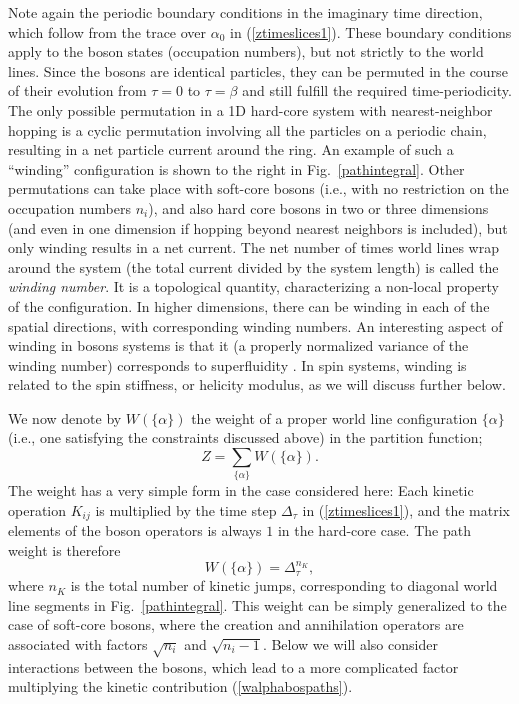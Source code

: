 \documentclass[draft,numberedheadings]{aipproc}
\begin{document}
Note again the periodic boundary conditions in the imaginary time direction, which follow from the trace over $\alpha_0$ in (\ref{ztimeslices1}). These boundary 
conditions apply to the boson states (occupation numbers), but not strictly to the world lines. Since the bosons are identical particles, they can be permuted in 
the course of their evolution from $\tau=0$ to $\tau=\beta$ and still fulfill the required time-periodicity. The only possible permutation in a 1D hard-core 
system with nearest-neighbor hopping is a cyclic permutation involving all the particles on a periodic chain, resulting in a net particle current around the 
ring. An example of such a ``winding'' configuration is shown to the right in Fig.~\ref{pathintegral}. Other permutations can take place with soft-core bosons
(i.e., with no restriction on the occupation numbers $n_i$), and also hard core bosons in two or three dimensions (and even in one dimension if hopping beyond 
nearest neighbors is included), but only winding results in a net current. The net number of times world lines wrap around the system (the total current divided 
by the system length) is called the {\it winding number}. It is a topological quantity, characterizing a non-local property of the configuration. In higher 
dimensions, there can be winding in each of the spatial directions, with corresponding winding numbers. An interesting aspect of winding in bosons systems is 
that it (a properly normalized variance of the winding number) corresponds to superfluidity \cite{feynman53,ceperley86}. In spin systems, winding is related to 
the spin stiffness, or helicity modulus, as we will discuss further below.

We now denote by $W(\{\alpha\})$ the weight of a proper world line configuration $\{\alpha\}$ (i.e., one satisfying the constraints discussed above) 
in the partition function;
\begin{equation}
Z=\sum_{\{\alpha\}}W(\{\alpha\}).
\label{walphazsumboson}
\end{equation}
The weight has a very simple form in the case considered here: Each kinetic operation $K_{ij}$ is multiplied by the time step $\Delta_\tau$ in 
(\ref{ztimeslices1}), and the matrix elements of the boson operators is always $1$ in the hard-core case. The path weight is therefore
\begin{equation}
W(\{\alpha\})=\Delta_\tau^{n_K},
\label{walphabospaths}
\end{equation}
where $n_K$ is the total number of kinetic jumps, corresponding to diagonal world line segments in Fig.~\ref{pathintegral}. This weight can be simply generalized 
to the case of soft-core bosons, where the creation and annihilation operators are associated with factors $\sqrt{n_i}$ and $\sqrt{n_i-1}$. Below we will also 
consider interactions between the bosons, which lead to a more complicated factor multiplying the kinetic contribution (\ref{walphabospaths}).
\end{document}
